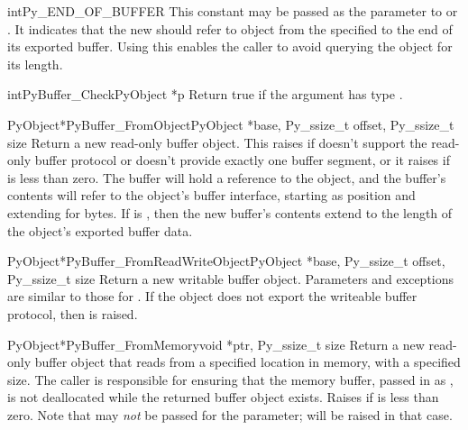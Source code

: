 \begin{cvardesc}{int}{Py_END_OF_BUFFER}
  This constant may be passed as the  parameter to
   or
  .  It indicates that the
  new  should refer to  object from
  the specified  to the end of its exported buffer.  Using
  this enables the caller to avoid querying the  object for
  its length.
\end{cvardesc}

\begin{cfuncdesc}{int}{PyBuffer_Check}{PyObject *p}
  Return true if the argument has type .
\end{cfuncdesc}

\begin{cfuncdesc}{PyObject*}{PyBuffer_FromObject}{PyObject *base,
                                                  Py_ssize_t offset, Py_ssize_t size}
  Return a new read-only buffer object.  This raises
   if  doesn't support the read-only
  buffer protocol or doesn't provide exactly one buffer segment, or it
  raises  if  is less than zero. The
  buffer will hold a reference to the  object, and the
  buffer's contents will refer to the  object's buffer
  interface, starting as position  and extending for
   bytes. If  is , then
  the new buffer's contents extend to the length of the 
  object's exported buffer data.
\end{cfuncdesc}

\begin{cfuncdesc}{PyObject*}{PyBuffer_FromReadWriteObject}{PyObject *base,
                                                           Py_ssize_t offset,
                                                           Py_ssize_t size}
  Return a new writable buffer object.  Parameters and exceptions are
  similar to those for .  If the
   object does not export the writeable buffer protocol,
  then  is raised.
\end{cfuncdesc}

\begin{cfuncdesc}{PyObject*}{PyBuffer_FromMemory}{void *ptr, Py_ssize_t size}
  Return a new read-only buffer object that reads from a specified
  location in memory, with a specified size.  The caller is
  responsible for ensuring that the memory buffer, passed in as
  , is not deallocated while the returned buffer object
  exists.  Raises  if  is less than
  zero.  Note that  may \emph{not} be
  passed for the  parameter;  will be
  raised in that case.
\end{cfuncdesc}

